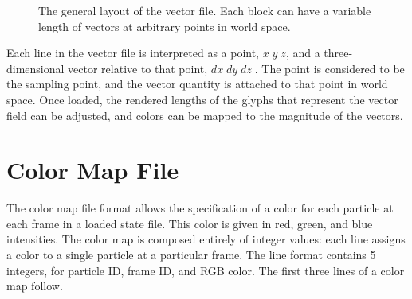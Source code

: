 \begin{figure}[htbp]
\centering
{}
\caption[The general layout of the vector file]{The general layout of the vector file.  Each block can have a variable length of vectors at arbitrary points in world space.}
\label{vector-layout}
\end{figure}

Each line in the vector file is interpreted as a point, $x \; y \; z$, and a three-dimensional vector relative to that point, $dx \; dy \; dz \; $.  The  point is considered to be the sampling point, and the vector quantity is attached to that point in world space.  Once loaded, the rendered lengths of the glyphs that represent the vector field can be adjusted, and colors can be mapped to the magnitude of the vectors.

\section{Color Map File}

The color map file format allows the specification of a color for each particle at each frame in a loaded state file.  This color is given in red, green, and blue intensities.  The color map is composed entirely of integer values: each line assigns a color to a single particle at a particular frame.  The line format contains 5 integers, for particle ID, frame ID, and RGB color.  The first three lines of a color map follow.

